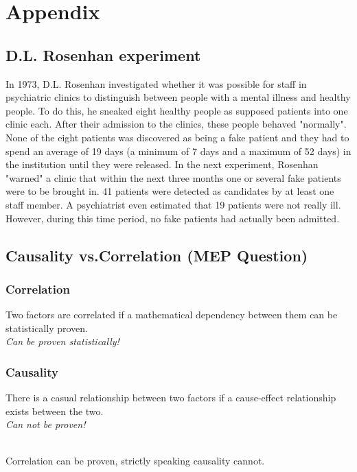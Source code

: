 \section{Appendix}

\subsection{D.L. Rosenhan experiment}
In 1973, D.L. Rosenhan investigated whether it was possible for staff in
psychiatric clinics to distinguish between people with a mental illness and
healthy people. To do this, he sneaked eight healthy people as supposed
patients into one clinic each. After their admission to the clinics, these people
behaved "normally". None of the eight patients was discovered as being a
fake patient and they had to spend an average of 19 days (a minimum of 7
days and a maximum of 52 days) in the institution until they were released.
In the next experiment, Rosenhan "warned" a clinic that within the next three
months one or several fake patients were to be brought in.
41 patients were detected as candidates by at least one staff member. A
psychiatrist even estimated that 19 patients were not really ill. However,
during this time period, no fake patients had actually been admitted.

\subsection{Causality vs.Correlation (MEP Question)}

\subsubsection{Correlation}
Two factors are correlated if a mathematical dependency between them can
be statistically proven.\\
\emph{Can be proven statistically!}

\subsubsection{Causality}
There is a casual relationship between two factors if a cause-effect
relationship exists between the two.\\
\emph{Can not be proven!}

\mbox{}\\
Correlation can be proven, strictly speaking causality
cannot.
